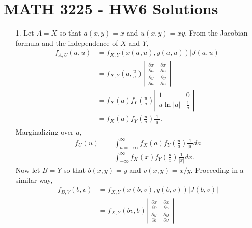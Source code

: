 \documentclass[a4paper,12pt]{article}
\begin{document}
\section*{MATH 3225 - HW6 Solutions}

\begin{enumerate}
    \item[1.] 
        Let $A = X$ so that $a(x, y) = x$ and $u(x, y) = xy$. From the Jacobian formula and the independence of $X$ and $Y$,
        \begin{align*}
            f_{A, U}(a, u) &= f_{X, Y} \left(x(a, u), y(a, u) \right) |J(a, u)| \\
            &= f_{X, Y}\left(a, \frac{u}{a} \right)
            \left| \begin{array}{cc}
                \frac{\partial x}{\partial a} & \frac{\partial x}{\partial u} \\
                \frac{\partial y}{\partial a} & \frac{\partial y}{\partial u}
            \end{array} \right| \\
            &= f_X(a) f_Y\left( \frac{u}{a} \right)
            \left| \begin{array}{cc}
                1 & 0 \\
                u \ln|a| & \frac{1}{a}
            \end{array} \right| \\
            &= f_X(a) f_Y\left( \frac{u}{a} \right) \frac{1}{|a|}.
        \end{align*}
        Marginalizing over $a$,
        \begin{align*}
            f_U(u) &= \int_{a = -\infty}^{\infty} f_X(a) f_Y\left( \frac{u}{a} \right) \frac{1}{|a|} da \\
            &= \int_{-\infty}^{\infty} f_X(x) f_Y\left( \frac{u}{x} \right) \frac{1}{|x|} dx.
        \end{align*}
        Now let $B = Y$ so that $b(x, y) = y$ and $v(x, y) = x / y$. Proceeding in a similar way,
        \begin{align*}
            f_{B, V}(b, v) &= f_{X, Y} \left(x(b, v), y(b, v) \right) |J(b, v)| \\
            &= f_{X, Y}\left(bv, b \right)
            \left| \begin{array}{cc}
                \frac{\partial x}{\partial b} & \frac{\partial x}{\partial v} \\
                \frac{\partial y}{\partial b} & \frac{\partial y}{\partial v}
            \end{array} \right| \\

\end{align*}
\end{enumerate}
\end{document}
